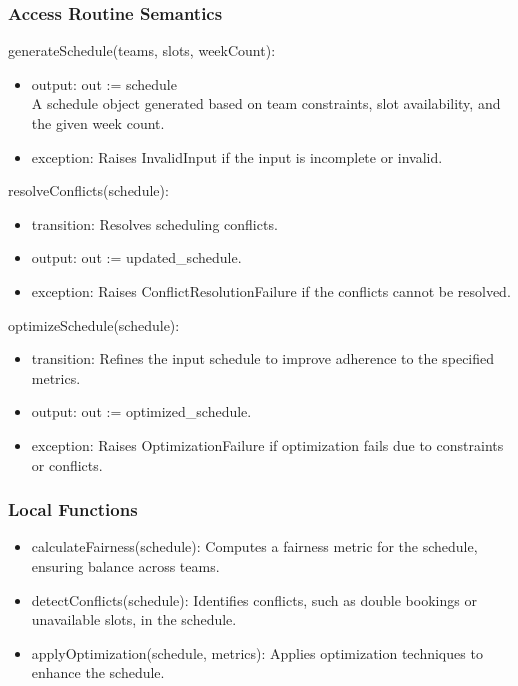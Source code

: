 \documentclass[12pt, titlepage]{article}
\begin{document}
\subsubsection{Access Routine Semantics}

\noindent generateSchedule(teams, slots, weekCount):
\begin{itemize}
  \item output: out := schedule \\ A schedule object generated based on team constraints, slot availability, and the given week count.
  \item exception: Raises InvalidInput if the input is incomplete or invalid.
\end{itemize}

\noindent resolveConflicts(schedule):
\begin{itemize}
  \item transition: Resolves scheduling conflicts.
  \item output: out := updated\_schedule.
  \item exception: Raises ConflictResolutionFailure if the conflicts cannot be resolved.
\end{itemize}

\noindent optimizeSchedule(schedule):
\begin{itemize}
  \item transition: Refines the input schedule to improve adherence to the specified metrics.
  \item output: out := optimized\_schedule.
  \item exception: Raises OptimizationFailure if optimization fails due to constraints or conflicts.
\end{itemize}

\subsubsection{Local Functions}
\begin{itemize}
  \item calculateFairness(schedule): Computes a fairness metric for the schedule, ensuring balance across teams.
  \item detectConflicts(schedule): Identifies conflicts, such as double bookings or unavailable slots, in the schedule.
  \item applyOptimization(schedule, metrics): Applies optimization techniques to enhance the schedule.
\end{itemize}
\end{document}
